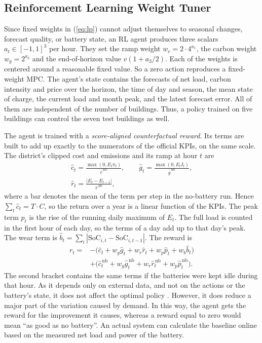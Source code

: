 \documentclass[conference]{IEEEtran}
\begin{document}
\subsection{Reinforcement Learning Weight Tuner}\label{sec:tuner}
Since fixed weights in (\ref{eq:lp}) cannot adjust themselves to seasonal changes, forecast quality, or battery state, an
RL agent produces three scalars $a_t \in [-1,1]^3$ per hour. They set the ramp weight $w_r = 2\cdot 4^{a_1}$, the carbon
weight $w_g = 2^{a_2}$ and the end-of-horizon value $v(1 + a_3/2)$. Each of the weights is centered around a reasonable
fixed value. So a zero action reproduces a fixed-weight MPC. The agent's state contains the forecasts of net load, carbon
intensity and price over the horizon, the time of day and season, the mean state of charge, the current load and month
peak, and the latest forecast error. All of them are independent of the number of buildings. Thus, a policy trained on
five buildings can control the seven test buildings as well.

The agent is trained with a \emph{score-aligned counterfactual reward}. Its terms are built to add up exactly to the
numerators of the official KPIs, on the same scale. The district's clipped cost and emissions and its ramp at hour $t$ are
\begin{equation}
\begin{gathered}
  \hat c_t = \frac{\max(0, E_t\pi_t)}{\bar c^{\,\mathrm{nb}}}, \qquad
  \hat g_t = \frac{\max(0, E_t I_t)}{\bar g^{\,\mathrm{nb}}}, \\
  \hat r_t = \frac{|E_t - E_{t-1}|}{\bar r^{\,\mathrm{nb}}},
\end{gathered}
\end{equation}
where a bar denotes the mean of the term per step in the no-battery run. Hence $\sum_t \hat c_t = T\cdot C$, so the
return over a year is a linear function of the KPIs. The peak term $\hat p_t$ is the rise of the running daily maximum of
$E_t$. The full load is counted in the first hour of each day, so the terms of a day add up to that day's peak. The wear
term is $\hat b_t = \sum_i |\mathrm{SoC}_{i,t}-\mathrm{SoC}_{i,t-1}|$. The reward is
\begin{equation}
  \begin{split}
  r_t = &-\bigl(\hat c_t + w_g\hat g_t + w_r\hat r_t + w_p\hat p_t + w_b\hat b_t\bigr) \\
        &+ \bigl(\hat c^{\,\mathrm{nb}}_t + w_g\hat g^{\,\mathrm{nb}}_t + w_r\hat r^{\,\mathrm{nb}}_t + w_p\hat p^{\,\mathrm{nb}}_t\bigr).
  \end{split}
  \label{eq:reward}
\end{equation}
The second bracket contains the same terms if the batteries were kept idle during that hour. As it depends only on
external data, and not on the actions or the battery's state, it does not affect the optimal policy \cite{ng1999shaping}.
However, it does reduce a major part of the variation caused by demand. In this way, the agent gets the reward for the
improvement it causes, whereas a reward equal to zero would mean ``as good as no battery''. An actual system can calculate
the baseline online based on the measured net load and power of the battery.
\end{document}
